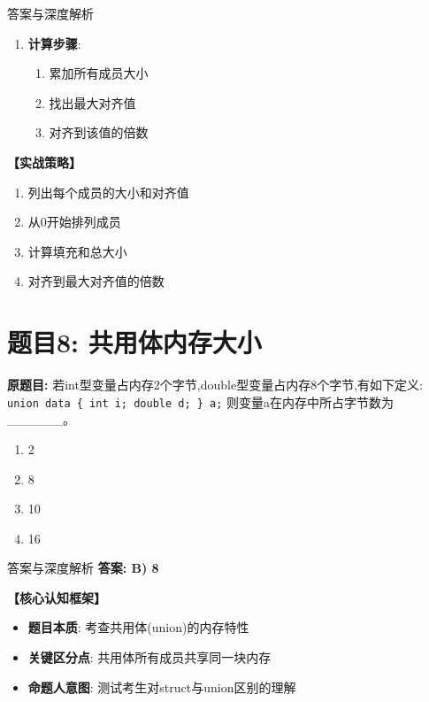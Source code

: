 \documentclass[a4paper,12pt]{article}
\begin{document}
\begin{enumerate}
\begin{bluebox}{答案与深度解析}
\begin{enumerate}[leftmargin=*, nosep]
		\item \textbf{计算步骤}:
		      \begin{enumerate}
			      \item 累加所有成员大小
			      \item 找出最大对齐值
			      \item 对齐到该值的倍数
		      \end{enumerate}
	\end{enumerate}

	\textbf{【实战策略】}
	\begin{enumerate}
		\item 列出每个成员的大小和对齐值
		\item 从0开始排列成员
		\item 计算填充和总大小
		\item 对齐到最大对齐值的倍数
	\end{enumerate}

\end{bluebox}

\vspace{1cm}

\section*{题目8: 共用体内存大小}

\textbf{原题目:}
若int型变量占内存2个字节,double型变量占内存8个字节,有如下定义:
\newline
\texttt{union data \{ int i; double d; \} a;}
\newline
则变量a在内存中所占字节数为\_\_\_\_\_\_。
\begin{enumerate}
	\item[A)] 2
	\item[B)] 8
	\item[C)] 10
	\item[D)] 16
\end{enumerate}

\begin{bluebox}{答案与深度解析}
	\textbf{答案: B) 8}

	\textbf{【核心认知框架】}
	\begin{itemize}[leftmargin=*, nosep]
		\item \textbf{题目本质}: 考查共用体(union)的内存特性
		\item \textbf{关键区分点}: 共用体所有成员共享同一块内存
		\item \textbf{命题人意图}: 测试考生对struct与union区别的理解
	\end{itemize}


\end{bluebox}
\end{enumerate}
\end{document}
